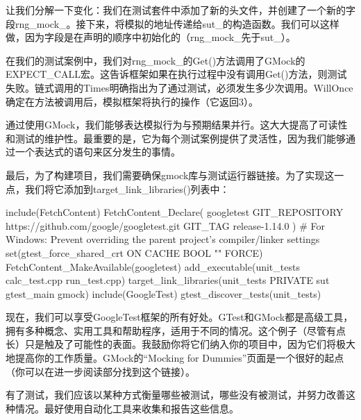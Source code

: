 让我们分解一下变化：我们在测试套件中添加了新的头文件，并创建了一个新的字段rng\_mock\_。接下来，将模拟的地址传递给sut\_的构造函数。我们可以这样做，因为字段是在声明的顺序中初始化的（rng\_mock\_先于sut\_）。

在我们的测试案例中，我们对rng\_mock\_的Get()方法调用了GMock的EXPECT\_CALL宏。这告诉框架如果在执行过程中没有调用Get()方法，则测试失败。链式调用的Times明确指出为了通过测试，必须发生多少次调用。WillOnce确定在方法被调用后，模拟框架将执行的操作（它返回3）。

通过使用GMock，我们能够表达模拟行为与预期结果并行。这大大提高了可读性和测试的维护性。最重要的是，它为每个测试案例提供了灵活性，因为我们能够通过一个表达式的语句来区分发生的事情。

最后，为了构建项目，我们需要确保gmock库与测试运行器链接。为了实现这一点，我们将它添加到target\_link\_libraries()列表中：


\begin{cmake}
include(FetchContent)
FetchContent_Declare(
    googletest
    GIT_REPOSITORY https://github.com/google/googletest.git
    GIT_TAG release-1.14.0
)
# For Windows: Prevent overriding the parent project's compiler/linker settings
set(gtest_force_shared_crt ON CACHE BOOL "" FORCE)
FetchContent_MakeAvailable(googletest)
add_executable(unit_tests
               calc_test.cpp
               run_test.cpp)
target_link_libraries(unit_tests PRIVATE sut gtest_main gmock)
include(GoogleTest)
gtest_discover_tests(unit_tests)
\end{cmake}

现在，我们可以享受GoogleTest框架的所有好处。GTest和GMock都是高级工具，拥有多种概念、实用工具和帮助程序，适用于不同的情况。这个例子（尽管有点长）只是触及了可能性的表面。我鼓励你将它们纳入你的项目中，因为它们将极大地提高你的工作质量。GMock的“Mocking for Dummies”页面是一个很好的起点（你可以在进一步阅读部分找到这个链接）。

有了测试，我们应该以某种方式衡量哪些被测试，哪些没有被测试，并努力改善这种情况。最好使用自动化工具来收集和报告这些信息。

















